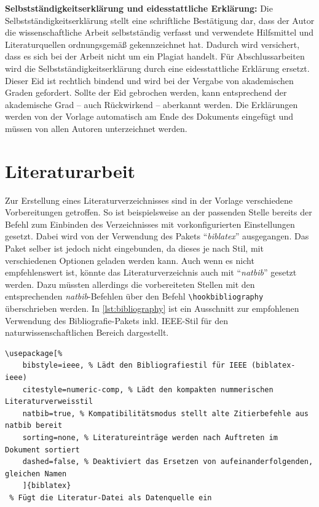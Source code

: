 	\textbf{Selbstständigkeitserklärung und eidesstattliche Erklärung:}\label{itm:soa}
	Die Selbstständigkeitserklärung stellt eine schriftliche Bestätigung dar, dass der Autor die wissenschaftliche Arbeit selbstständig verfasst und verwendete Hilfsmittel und Literaturquellen ordnungsgemäß gekennzeichnet hat.
	Dadurch wird versichert, dass es sich bei der Arbeit nicht um ein Plagiat handelt.
	Für Abschlussarbeiten wird die Selbstständigkeitserklärung durch eine eidesstattliche Erklärung ersetzt.
	Dieser Eid ist rechtlich bindend und wird bei der Vergabe von akademischen Graden gefordert.
	Sollte der Eid gebrochen werden, kann entsprechend der akademische Grad -- auch Rückwirkend -- aberkannt werden.
	Die Erklärungen werden von der Vorlage automatisch am Ende des Dokuments eingefügt und müssen von allen Autoren unterzeichnet werden.


	
	\chapter{Literaturarbeit}
	\label{cha:bibliography}
	
	Zur Erstellung eines Literaturverzeichnisses sind in der Vorlage verschiedene Vorbereitungen getroffen.
	So ist beispielsweise an der passenden Stelle bereits der Befehl zum Einbinden des Verzeichnisses mit vorkonfigurierten Einstellungen gesetzt.
	Dabei wird von der Verwendung des Pakets \enquote{\textit{biblatex}} ausgegangen.
	Das Paket selber ist jedoch nicht eingebunden, da dieses je nach Stil, mit verschiedenen Optionen geladen werden kann.
	Auch wenn es nicht empfehlenswert ist, könnte das Literaturverzeichnis auch mit \enquote{\textit{natbib}} gesetzt werden.
	Dazu müssten allerdings die vorbereiteten Stellen mit den entsprechenden \textit{natbib}-Befehlen über den Befehl \verb|\hookbibliography| überschrieben werden.
	In \cref{lst:bibliography} ist ein Ausschnitt zur empfohlenen Verwendung des Bibliografie-Pakets inkl. IEEE-Stil für den naturwissenschaftlichen Bereich dargestellt.
	
	\begin{lstlisting}[style=MyLatexStyle,caption={Beispielcode zum Konfigurieren des Literaturverzeichnisses mit dem Paket \textit{biblatex}.},label=lst:bibliography]
\usepackage[%
	bibstyle=ieee, % Lädt den Bibliografiestil für IEEE (biblatex-ieee)
	citestyle=numeric-comp, % Lädt den kompakten nummerischen Literaturverweisstil
	natbib=true, % Kompatibilitätsmodus stellt alte Zitierbefehle aus natbib bereit
	sorting=none, % Literatureinträge werden nach Auftreten im Dokument sortiert
	dashed=false, % Deaktiviert das Ersetzen von aufeinanderfolgenden, gleichen Namen
	]{biblatex}
 % Fügt die Literatur-Datei als Datenquelle ein
	\end{lstlisting}
	
